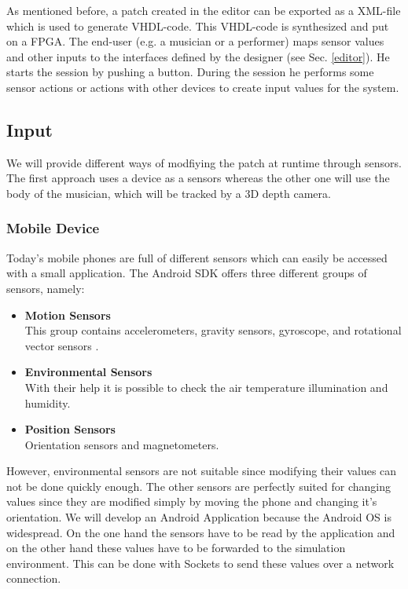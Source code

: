 	As mentioned before, a patch created in the editor can be exported as a XML-file which is used to generate VHDL-code. This VHDL-code is synthesized and put on a \ac{FPGA}. The end-user (e.g. a musician or a performer) maps sensor values and other inputs to the interfaces defined by the designer (see Sec. \ref{editor}). He starts the session by pushing a button. During the session he performs some sensor actions or actions with other devices to create input values for the system.
	
\subsection{Input}
We will provide different ways of modfiying the patch at runtime through sensors. The first approach uses a device as a sensors whereas the other one will use the body of the musician, which will be tracked by a 3D depth camera. 

\subsubsection{Mobile Device}
Today's mobile phones are full of different sensors which can easily be accessed with a small application. The Android SDK offers three different groups of sensors, namely:
\begin{itemize}
	\item \textbf{Motion Sensors} \\
			This group contains accelerometers, gravity sensors, gyroscope, and rotational vector sensors .
	\item \textbf{Environmental Sensors} \\
			With their help it is possible to check the air temperature illumination and humidity.
	\item \textbf{Position Sensors} \\
			Orientation sensors and magnetometers.
\end{itemize}

However, environmental sensors are not suitable since modifying their values can not be done quickly enough. The other sensors are perfectly suited for changing values since they are modified simply by moving the phone and changing it's orientation. We will develop an Android Application because the Android OS is widespread. On the one hand the sensors have to be read by the application and on the other hand these values have to be forwarded to the simulation environment. This can be done with Sockets to send these values over a network connection.

